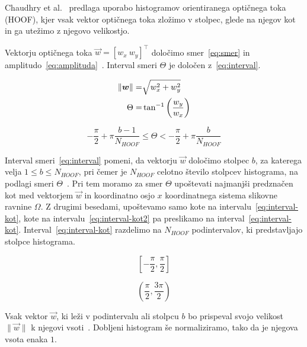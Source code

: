 Chaudhry et al.~\cite{chaudhry2009histograms} predlaga uporabo histogramov orientiranega optičnega toka (HOOF), kjer vsak vektor optičnega toka zložimo v stolpec, glede na njegov kot in ga utežimo z njegovo velikostjo.

Vektorju optičnega toka $\vec{w} = [w_x~w_y]^\top$ določimo smer~\eqref{eq:smer} in amplitudo~\eqref{eq:amplituda}~\cite{chaudhry2009histograms}. Interval smeri $\Theta$ je določen z~\eqref{eq:interval}. 

\begin{align}
    \left\lVert {\boldsymbol{w}} \right\rVert = & \sqrt{w_x^2 + w_y^2} \label{eq:amplituda} \\
    \Theta = & \tan^{-1}\left( \frac{w_y}{w_x} \right) \label{eq:smer}
\end{align}


\begin{equation}\label{eq:interval}
	-\frac{\pi}{2} + \pi \frac{b - 1}{N_{HOOF}} \leq \Theta < - \frac{\pi}{2} + \pi \frac{b}{N_{HOOF}}
\end{equation}


Interval smeri~\eqref{eq:interval} pomeni, da vektorju $\vec{w}$ določimo stolpec $b$, za katerega velja $1 \leq b \leq N_{HOOF}$, pri čemer je $N_{HOOF}$ celotno število stolpcev histograma, na podlagi smeri $\Theta$~\cite{chaudhry2009histograms}. Pri tem moramo za smer $\Theta$ upoštevati najmanjši predznačen kot med vektorjem $\vec{w}$ in koordinatno osjo $x$ koordinatnega sistema slikovne ravnine $\varOmega$. Z drugimi besedami, upoštevamo samo kote na intervalu~\eqref{eq:interval-kot}, kote na intervalu~\eqref{eq:interval-kot2} pa preslikamo na interval~\eqref{eq:interval-kot}. Interval~\eqref{eq:interval-kot} razdelimo na $N_{HOOF}$ podintervalov, ki predstavljajo stolpce histograma. 

\begin{equation}\label{eq:interval-kot}
	\left[-\frac{\pi}{2}, \frac{\pi}{2}\right]
\end{equation}

\begin{equation}\label{eq:interval-kot2}
	\left(\frac{\pi}{2},\frac{3\pi}{2}\right)
\end{equation}

Vsak vektor $\vec{w}$, ki leži v podintervalu ali stolpcu $b$ bo prispeval svojo velikost $\|\vec{w} \|$ k njegovi vsoti~\cite{chaudhry2009histograms}. Dobljeni histogram še normaliziramo, tako da je njegova vsota enaka $1$.





